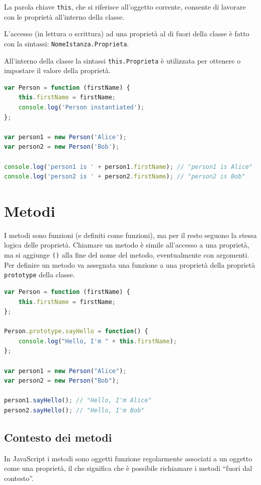 La parola chiave \texttt{this}, che si riferisce all'oggetto corrente, consente di lavorare con le proprietà all'interno della classe.

L'accesso (in lettura o scrittura) ad una proprietà al di fuori della classe è fatto con la sintassi: \texttt{NomeIstanza.Proprieta}.

All'interno della classe la sintassi \texttt{this.Proprieta} è utilizzata per ottenere o impostare il valore della proprietà.

\begin{lstlisting}[language=JavaScript]
var Person = function (firstName) {
    this.firstName = firstName;
    console.log('Person instantiated');
};

var person1 = new Person('Alice');
var person2 = new Person('Bob');

console.log('person1 is ' + person1.firstName); // "person1 is Alice"
console.log('person2 is ' + person2.firstName); // "person2 is Bob"
\end{lstlisting}

\section{Metodi}

I metodi sono funzioni (e definiti come funzioni), ma per il resto seguono la stessa logica delle proprietà. Chiamare un metodo è simile all'accesso a una proprietà, ma si aggiunge \texttt{()} alla fine del nome del metodo, eventualmente con argomenti. Per definire un metodo va assegnata una funzione a una proprietà della proprietà \texttt{prototype} della classe.

\begin{lstlisting}[language=JavaScript]
var Person = function (firstName) {
    this.firstName = firstName;
};

Person.prototype.sayHello = function() {
    console.log("Hello, I'm " + this.firstName);
};

var person1 = new Person("Alice");
var person2 = new Person("Bob");

person1.sayHello(); // "Hello, I'm Alice"
person2.sayHello(); // "Hello, I'm Bob"
\end{lstlisting}

\subsection{Contesto dei metodi}

In JavaScript i metodi sono oggetti funzione regolarmente associati a un oggetto come una proprietà, il che significa che è possibile richiamare i metodi ``fuori dal contesto''.

